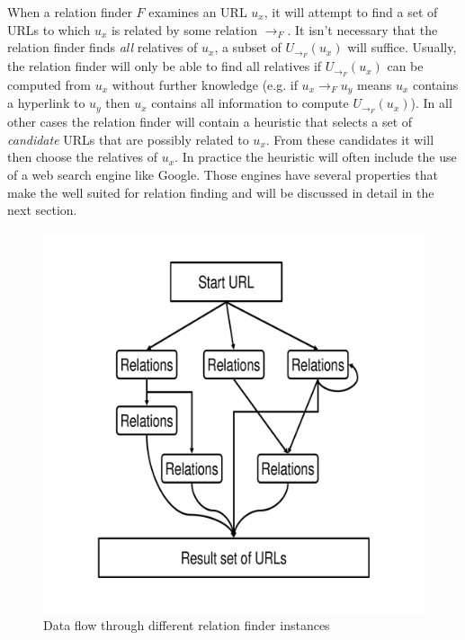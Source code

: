 \documentclass[a4paper,twoside]{danarticle}
\theoremstyle{remark}
\begin{document}
       When a relation finder $ F $ examines an URL $ u_x $, it will attempt to 
       find a set of URLs to which $ u_x $ is related by some relation 
       $ \rightarrow_F $. It isn't necessary that the relation finder finds 
       \emph{all} relatives of $ u_x $, a subset of $ U_{\rightarrow_F}(u_x) $ 
       will suffice. Usually, the relation finder will only be able to find 
       all relatives if $ U_{\rightarrow_F}(u_x) $ can be computed from $ u_x $ 
       without further knowledge (e.g. if $ u_x \rightarrow_F u_y $ means 
       $ u_x $ contains a hyperlink to $ u_y $ then $ u_x $ contains all 
       information to compute $ U_{\rightarrow_F}(u_x) $). In all other cases the 
       relation finder will contain a heuristic that selects a set of 
       \textit{candidate} URLs that are possibly related to $ u_x $. From these 
       candidates it will then choose the relatives of $ u_x $. In practice the 
       heuristic will often include the use of a web search engine like 
       Google\cite{google}. Those engines have several properties that make the well 
       suited for relation finding and will be discussed in detail in the next 
       section.
       
       \begin{figure}[ht]
         \centering
	     \includegraphics[width=12cm]{relations}
	     \caption{Data flow through different relation finder instances}
	     \label{relations}
       \end{figure}
       
\end{document}
